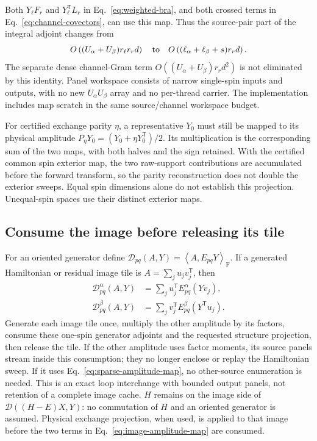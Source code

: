 \documentclass[11pt,a4paper]{article}
\newcommand{\Tr}{^{\mathsf T}}
\newcommand{\ip}[2]{\left\langle #1,#2\right\rangle_{\mathrm F}}
\begin{document}
Both $Y_\ell F_r$ and $Y_\ell\Tr L_r$ in
Eq.~\eqref{eq:weighted-bra}, and both crossed terms in
Eq.~\eqref{eq:channel-covectors}, can use this map. Thus the source-pair
part of the integral adjoint changes from
\begin{equation}
 O\left((U_\alpha+U_\beta)r_\ell r_r d\right)
 \quad\hbox{to}\quad
 O\left((\ell_\alpha+\ell_\beta+s)r_r d\right).
\end{equation}
The separate dense channel-Gram term
$O((U_\alpha+U_\beta)r_r d^2)$ is not eliminated by this identity.
Panel workspace consists of narrow single-spin inputs and outputs, with no
new $U_\alpha U_\beta$ array and no per-thread carrier. The implementation
includes map scratch in the same source/channel workspace budget.

For certified exchange parity $\eta$, a representative $Y_0$ must still be
mapped to its physical amplitude $P_\eta Y_0=(Y_0+\eta Y_0\Tr)/2$.
Its multiplication is the corresponding sum of the two maps, with both
halves and the sign retained. With the certified common spin exterior map,
the two raw-support contributions are accumulated before the forward
transform, so the parity reconstruction does not double the exterior sweeps.
Equal spin dimensions alone do not establish
this projection. Unequal-spin spaces use their distinct exterior maps.

\subsection{Consume the image before releasing its tile}

For an oriented generator define
$\mathcal D_{pq}(A,Y)=\ip{A}{E_{pq}Y}$.
If a generated Hamiltonian or residual image tile is
$A=\sum_j u_jv_j\Tr$, then
\begin{align}\label{eq:image-amplitude-map}
 \mathcal D^\alpha_{pq}(A,Y)
   &=\sum_j u_j\Tr E^\alpha_{pq}(Yv_j),\\
 \mathcal D^\beta_{pq}(A,Y)
   &=\sum_j v_j\Tr E^\beta_{pq}(Y\Tr u_j).
\end{align}
Generate each image tile once, multiply the other amplitude by its factors,
consume these one-spin generator adjoints and the requested structure
projection, then release the tile. If the other amplitude uses factor
moments, its source panels stream inside this consumption; they no longer
enclose or replay the Hamiltonian sweep. If it uses
Eq.~\eqref{eq:sparse-amplitude-map}, no other-source enumeration is needed.
This is an exact loop interchange with bounded output panels, not retention
of a complete image cache. $H$ remains on the image side of
$\mathcal D((H-E)X,Y)$: no commutation of $H$ and an oriented generator is
assumed. Physical exchange projection, when used, is applied to that image
before the two terms in Eq.~\eqref{eq:image-amplitude-map} are consumed.
\end{document}
